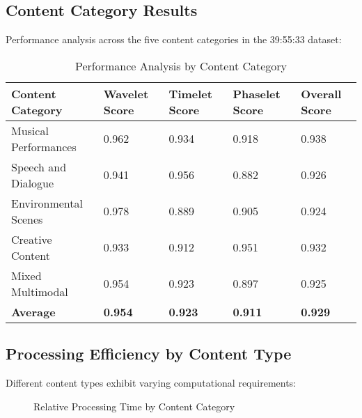 \subsection{Content Category Results}

Performance analysis across the five content categories in the 39:55:33 dataset:

\begin{table}[h]
\centering
\begin{tabular}{|l|l|l|l|l|}
\hline
\textbf{Content Category} & \textbf{Wavelet Score} & \textbf{Timelet Score} & \textbf{Phaselet Score} & \textbf{Overall Score} \\
\hline
Musical Performances & 0.962 & 0.934 & 0.918 & 0.938 \\
\hline
Speech and Dialogue & 0.941 & 0.956 & 0.882 & 0.926 \\
\hline
Environmental Scenes & 0.978 & 0.889 & 0.905 & 0.924 \\
\hline
Creative Content & 0.933 & 0.912 & 0.951 & 0.932 \\
\hline
Mixed Multimodal & 0.954 & 0.923 & 0.897 & 0.925 \\
\hline
\textbf{Average} & \textbf{0.954} & \textbf{0.923} & \textbf{0.911} & \textbf{0.929} \\
\hline
\end{tabular}
\caption{Performance Analysis by Content Category}
\end{table}

\subsection{Processing Efficiency by Content Type}

Different content types exhibit varying computational requirements:

\begin{figure}[h]
\centering
{}
\caption{Relative Processing Time by Content Category}
\end{figure}

